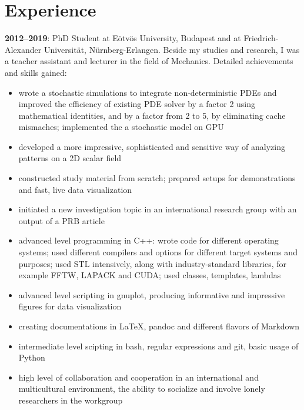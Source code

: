 \documentclass[11pt,a4paper,sans]{moderncv}        %
\begin{document}
\section{Experience}
\textbf{2012--2019}: PhD Student at Eötvös University, Budapest and at Friedrich-Alexander Universität, Nürnberg-Erlangen. Beside my studies and research, I was a teacher assistant and lecturer in the field of Mechanics. Detailed achievements and skills gained:
\begin{itemize}
\item wrote a stochastic simulations to integrate non-deterministic PDEs and 
improved the efficiency of existing PDE solver by a factor 2 using mathematical identities, and by a factor from 2 to 5, by eliminating cache mismaches; implemented the a stochastic model on GPU
\item developed a more impressive, sophisticated and sensitive way of analyzing patterns on a 2D scalar field
\item constructed study material from scratch; prepared setups for demonstrations and fast, live data visualization
\item initiated a new investigation topic in an international research group with an output of a PRB article
\item advanced level programming in C++: wrote code for different operating systems; used different compilers and options for different target systems and purposes; used STL intensively, along with industry-standard libraries, for example FFTW, LAPACK and CUDA; used classes, templates, lambdas
\item advanced level scripting in gnuplot, producing informative and impressive figures for data visualization
\item creating documentations in LaTeX, pandoc and different flavors of Markdown
\item intermediate level scipting in bash, regular expressions and git, basic usage of Python
\item high level of collaboration and cooperation in an international and multicultural environment, the ability to socialize and involve lonely researchers in the workgroup
\end{itemize}
\end{document}
